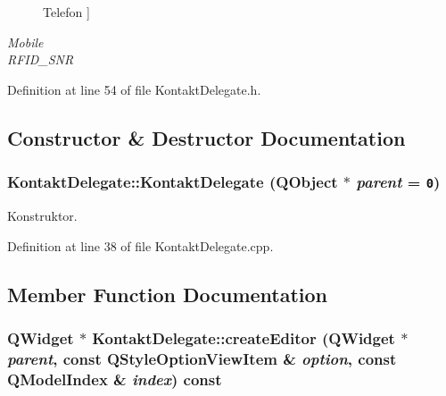 \begin{Desc}
\begin{description}
{\hypertarget{class_kontakt_delegate_fc7afbf9a00884adacdccdfd06ffc7a31eb4c57cff8ec4138bcd0409a136ccc3}{
Telefon}
\label{class_kontakt_delegate_fc7afbf9a00884adacdccdfd06ffc7a31eb4c57cff8ec4138bcd0409a136ccc3}
}]\item[{\em 
\hypertarget{class_kontakt_delegate_fc7afbf9a00884adacdccdfd06ffc7a32084ea40573bc29804b7f92f6fe6f522}{
Mobile}
\label{class_kontakt_delegate_fc7afbf9a00884adacdccdfd06ffc7a32084ea40573bc29804b7f92f6fe6f522}
}]\item[{\em 
\hypertarget{class_kontakt_delegate_fc7afbf9a00884adacdccdfd06ffc7a31b49488741e98d66eacca2bcd21395ef}{
RFID\_\-SNR}
\label{class_kontakt_delegate_fc7afbf9a00884adacdccdfd06ffc7a31b49488741e98d66eacca2bcd21395ef}
}]\end{description}
\end{Desc}



Definition at line 54 of file KontaktDelegate.h.

\subsection{Constructor \& Destructor Documentation}
\hypertarget{class_kontakt_delegate_b0c6c1d150ba191eeaa0c982ee497b61}{
\subsubsection[KontaktDelegate]{\setlength{\rightskip}{0pt plus 5cm}KontaktDelegate::KontaktDelegate (QObject $\ast$ {\em parent} = {\tt 0})}}
\label{class_kontakt_delegate_b0c6c1d150ba191eeaa0c982ee497b61}


Konstruktor. 



Definition at line 38 of file KontaktDelegate.cpp.

\subsection{Member Function Documentation}
\hypertarget{class_kontakt_delegate_ba53fe0194a7de1a6d0eb9cb20153ab3}{
\subsubsection[createEditor]{\setlength{\rightskip}{0pt plus 5cm}QWidget $\ast$ KontaktDelegate::createEditor (QWidget $\ast$ {\em parent}, \/  const QStyleOptionViewItem \& {\em option}, \/  const QModelIndex \& {\em index}) const}}
\label{class_kontakt_delegate_ba53fe0194a7de1a6d0eb9cb20153ab3}


